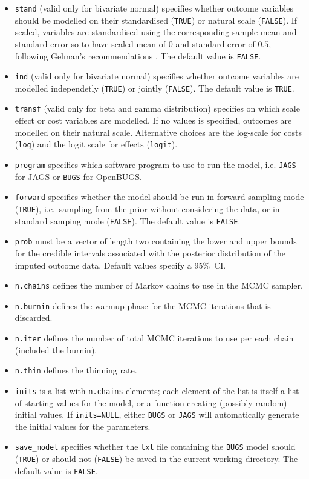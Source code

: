 \documentclass[]{article}
\begin{document}
\begin{itemize}
\item
  \texttt{stand} (valid only for bivariate normal) specifies whether
  outcome variables should be modelled on their standardised
  (\texttt{TRUE}) or natural scale (\texttt{FALSE}). If scaled,
  variables are standardised using the corresponding sample mean and
  standard error so to have scaled mean of \(0\) and standard error of
  \(0.5\), following Gelman's recommendations \citep{Gelmanp}. The
  default value is \texttt{FALSE}.
\item
  \texttt{ind} (valid only for bivariate normal) specifies whether
  outcome variables are modelled independetly (\texttt{TRUE}) or jointly
  (\texttt{FALSE}). The default value is \texttt{TRUE}.
  \item
  \texttt{transf} (valid only for beta and gamma distribution) specifies on which scale effect or cost variables are modelled.
  If no values is specified, outcomes are modelled on their natural scale. Alternative choices
  are the log-scale for costs (\texttt{log}) and the logit scale for effects (\texttt{logit}).
\item
  \texttt{program} specifies which software program to use to run the
  model, i.e. \texttt{JAGS} for JAGS or \texttt{BUGS} for OpenBUGS.
\item
  \texttt{forward} specifies whether the model should be run in forward
  sampling mode (\texttt{TRUE}), i.e.~sampling from the prior without
  considering the data, or in standard samping mode (\texttt{FALSE}).
  The default value is \texttt{FALSE}.
\item
  \texttt{prob} must be a vector of length two containing the lower and
  upper bounds for the credible intervals associated with the posterior
  distribution of the imputed outcome data. Default values specify a
  95\%~CI.
\item
  \texttt{n.chains} defines the number of Markov chains to use in the
  MCMC sampler.
\item
  \texttt{n.burnin} defines the warmup phase for the MCMC iterations
  that is discarded.
\item
  \texttt{n.iter} defines the number of total MCMC iterations to use per
  each chain (included the burnin).
\item
  \texttt{n.thin} defines the thinning rate.
\item
  \texttt{inits} is a list with \texttt{n.chains} elements; each element
  of the list is itself a list of starting values for the model, or a
  function creating (possibly random) initial values. If
  \texttt{inits=NULL}, either \texttt{BUGS} or \texttt{JAGS} will
  automatically generate the initial values for the parameters.
\item
  \texttt{save\_model} specifies whether the \texttt{txt} file
  containing the \texttt{BUGS} model should (\texttt{TRUE}) or should
  not (\texttt{FALSE}) be saved in the current working directory. The
  default value is \texttt{FALSE}.
\end{itemize}
\end{document}
